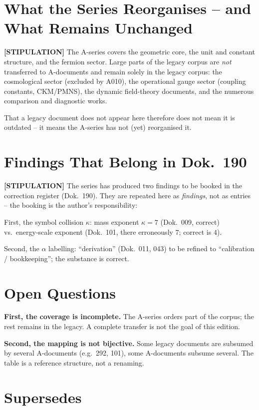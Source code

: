 \section{What the Series Reorganises -- and What Remains Unchanged}

\textbf{[STIPULATION]} The A-series covers the geometric core, the unit and
constant structure, and the fermion sector. Large parts of the legacy corpus are
\emph{not} transferred to A-documents and remain solely in the legacy corpus: the
cosmological sector (excluded by A010), the operational gauge sector (coupling constants, CKM/PMNS), the dynamic field-theory
documents, and the numerous comparison and diagnostic works.

That a legacy document does not appear here therefore does not mean it is
outdated -- it means the A-series has not (yet) reorganised it.

\section{Findings That Belong in Dok.~190}

\textbf{[STIPULATION]} The series has produced two findings to be booked in the
correction register (Dok.~190). They are repeated here as \emph{findings}, not
as entries -- the booking is the author's responsibility:

First, the symbol collision $\kappa$: mass exponent $\kappa=7$ (Dok.~009, correct)
vs.\ energy-scale exponent (Dok.~101, there erroneously $7$; correct is $4$).

Second, the $\alpha$ labelling: ``derivation'' (Dok.~011, 043) to be refined to
``calibration / bookkeeping''; the substance is correct.

\section{Open Questions}

\textbf{First, the coverage is incomplete.} The A-series orders part of the
corpus; the rest remains in the legacy. A complete transfer is not the goal of
this edition.

\textbf{Second, the mapping is not bijective.} Some legacy documents are subsumed
by several A-documents (e.g.\ 292, 101), some A-documents subsume several. The
table is a reference structure, not a renaming.

\section{Supersedes}

